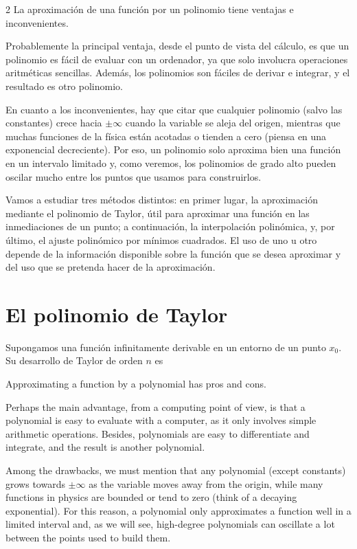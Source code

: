 \begin{paracol}{2}
La aproximación de una función por un polinomio tiene ventajas e inconvenientes.

Probablemente la principal ventaja, desde el punto de vista del cálculo, es que un polinomio es fácil de evaluar con un ordenador, ya que solo involucra operaciones aritméticas sencillas. Además, los polinomios son fáciles de derivar e integrar, y el resultado es otro polinomio.

En cuanto a los inconvenientes, hay que citar que cualquier polinomio (salvo las constantes) crece hacia $\pm\infty$ cuando la variable se aleja del origen, mientras que muchas funciones de la física están acotadas o tienden a cero (piensa en una exponencial decreciente). Por eso, un polinomio solo aproxima bien una función en un intervalo limitado y, como veremos, los polinomios de grado alto pueden oscilar mucho entre los puntos que usamos para construirlos.

Vamos a estudiar tres métodos distintos: en primer lugar, la aproximación mediante el polinomio de Taylor, útil para aproximar una función en las inmediaciones de un punto; a continuación, la interpolación polinómica, y, por último, el ajuste polinómico por mínimos cuadrados. El uso de uno u otro depende de la información disponible sobre la función que se desea aproximar y del uso que se pretenda hacer de la aproximación.

\section{El polinomio de Taylor}

Supongamos una función infinitamente derivable en un entorno de un punto $x_0$. Su desarrollo de Taylor de orden $n$ es

\switchcolumn
Approximating a function by a polynomial has pros and cons.

Perhaps the main advantage, from a computing point of view, is that a polynomial is easy to evaluate with a computer, as it only involves simple arithmetic operations. Besides, polynomials are easy to differentiate and integrate, and the result is another polynomial.

Among the drawbacks, we must mention that any polynomial (except constants) grows towards $\pm\infty$ as the variable moves away from the origin, while many functions in physics are bounded or tend to zero (think of a decaying exponential). For this reason, a polynomial only approximates a function well in a limited interval and, as we will see, high-degree polynomials can oscillate a lot between the points used to build them.


\end{paracol}
